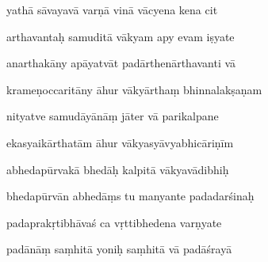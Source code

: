 \documentclass[article,12pt,a4paper]{memoir}%
\newcounter{parCount}
\begin{document}
	  
	  \pstart {} yathā sāvayavā varṇā vinā vācyena kena cit 
	{}
	\pend%
      

	  
	  \pstart \leavevmode%
	arthavantaḥ samuditā vākyam apy evam iṣyate 
	{}
	\pend%
      

	  
	  \pstart {} anarthakāny apāyatvāt padārthenārthavanti vā 
	{}
	\pend%
      

	  
	  \pstart \leavevmode%
	krameṇoccaritāny āhur vākyārthaṃ bhinnalakṣaṇam 
	{}
	\pend%
      

	  
	  \pstart {} nityatve samudāyānāṃ jāter vā parikalpane 
	{}
	\pend%
      

	  
	  \pstart \leavevmode%
	ekasyaikārthatām āhur vākyasyāvyabhicāriṇīm 
	{}
	\pend%
      

	  
	  \pstart {} abhedapūrvakā bhedāḥ kalpitā vākyavādibhiḥ 
	{}
	\pend%
      

	  
	  \pstart \leavevmode%
	bhedapūrvān abhedāṃs tu manyante padadarśinaḥ 
	{}
	\pend%
      

	  
	  \pstart {} padaprakṛtibhāvaś ca vṛttibhedena varṇyate 
	{}
	\pend%
      

	  
	  \pstart \leavevmode%
	padānāṃ saṃhitā yoniḥ saṃhitā vā padāśrayā 
	{}
	\pend%
      
\end{document}
